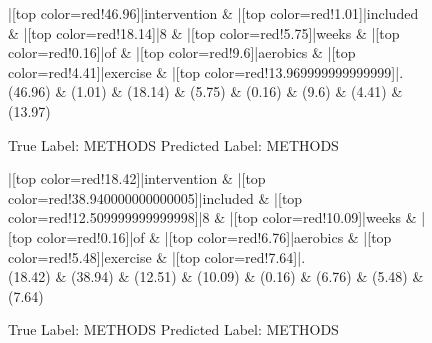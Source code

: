 \documentclass[a4paper, landscape]{article}
\begin{document}
\clearpage
\begin{figure}
\begin{center}
\begin{dependency}
\begin{deptext}
|[top color=red!46.96]|intervention \& |[top color=red!1.01]|included \& |[top color=red!18.14]|8 \& |[top color=red!5.75]|weeks \& |[top color=red!0.16]|of \& |[top color=red!9.6]|aerobics \& |[top color=red!4.41]|exercise \& |[top color=red!13.969999999999999]|.\\
(46.96) \& (1.01) \& (18.14) \& (5.75) \& (0.16) \& (9.6) \& (4.41) \& (13.97)\\
\end{deptext}
\end{dependency}
\end{center}
\caption{True Label: METHODS Predicted Label: METHODS}
\end{figure}
\clearpage
\begin{figure}
\begin{center}
\begin{dependency}
\begin{deptext}
|[top color=red!18.42]|intervention \& |[top color=red!38.940000000000005]|included \& |[top color=red!12.509999999999998]|8 \& |[top color=red!10.09]|weeks \& |[top color=red!0.16]|of \& |[top color=red!6.76]|aerobics \& |[top color=red!5.48]|exercise \& |[top color=red!7.64]|.\\
(18.42) \& (38.94) \& (12.51) \& (10.09) \& (0.16) \& (6.76) \& (5.48) \& (7.64)\\
\end{deptext}
\end{dependency}
\end{center}
\caption{True Label: METHODS Predicted Label: METHODS}
\end{figure}
\clearpage
\end{document}
